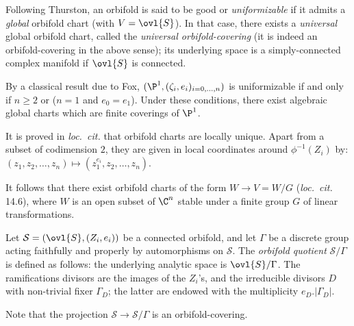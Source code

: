 \begin{para}\label{para::4.1.4} Following Thurston, an orbifold is said to be
 good or {\it uniformizable} if it admits a {\it global} orbifold chart
 (\ie with $V=\ovl{S}$).  In that case, there exists a {\it universal} 
 global orbifold chart, called the {\it universal orbifold-covering} (it
 is indeed an orbifold-covering in the above sense); its underlying space
 is a simply-connected complex manifold if $\ovl{S}$ is connected.
 
 \medskip{} By a classical result due to Fox,
 $(\P^1, (\zeta_i,e_i)_{i=0,\ldots, n})$ is uniformizable if and only if
 $n\geq 2$ or ($n=1$ and $e_0=e_1$). Under these conditions, 
 there exist algebraic global charts which are finite coverings of $\P^1$. 
\end{para}

\begin{para}\label{para::4.1.5} It is proved in {\it loc.~cit.} that orbifold
 charts are locally unique. Apart from a subset of codimension $2$,
 they are given in local coordinates around $\phi^{-1}(Z_i)$ by:
 $(z_1,z_2,\ldots, z_n)\mapsto (z_1^{e_i},z_2,\ldots, z_n)$.
 
 \noindent It follows that there exist orbifold charts of the form
 $W\to V=W/G$ ({\it loc.~cit.} 14.6), where $W$ is an
 open subset of $\C^n$ stable under a finite group $G$ of linear
 transformations.
\end{para}

\begin{para}\label{para::4.1.6} Let $\mathcal{S}=(\ovl{S}, (Z_i,e_i))$ be a
 connected orbifold, and let $\Gamma$ be a discrete group acting
 faithfully and properly by automorphisms on $\mathcal{S}$. The {\it orbifold
 quotient} $\mathcal{S}/\Gamma$ is defined as follows: the underlying
 analytic space is $\ovl{S}/\Gamma$. The ramifications divisors are the
 images of the $Z_i$'s, and the irreducible divisors $D$ with
 non-trivial fixer $\Gamma_D$; the
 latter are endowed with the multiplicity $e_D.| \Gamma_D|$.

 Note that the projection $\mathcal{S}\to \mathcal{S}/\Gamma$ is an
 orbifold-covering.
\end{para}

